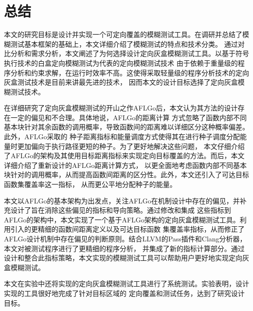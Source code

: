 \documentclass[bachelor]{njupthesis}
\begin{document}
\section{总结}
本文的研究目标是设计并实现一个可定向覆盖的模糊测试工具。在调研并总结了模糊测试基本框架的基础上，本文详细介绍了模糊测试的特点和技术分类。
通过对比分析和需求分析，本文阐述了为何选择设计定向灰盒模糊测试工具。以基于符号执行技术的白盒定向模糊测试为代表的定向模糊测试技术
由于依赖于重量级的程序分析和约束求解，在运行时效率不高。这使得采取轻量级的程序分析技术的定向灰盒测试技术是目前来讲最先进的技术，
因而本文的设计目标选择了定向灰盒模糊测试技术。

在详细研究了定向灰盒模糊测试的开山之作AFLGo后，本文认为其方法的设计存在一定的偏见和不合理。具体地说，AFLGo的距离计算
方式忽略了函数内部不同基本块针对其余函数的调用概率，导致函数间的距离难以详细区分这种概率偏差。此外，AFLGo采取的
种子距离指标和能量调度方式使得其在进行种子调度分配能量时更加偏向于执行路径更短的种子。为了更好地解决这些问题，
本文仔细介绍了AFLGo的架构及其使用目标距离指标来实现定向目标覆盖的方法。而后，本文详细介绍了重新设计的AFLGo距离计算方式，
以更全面地考虑函数内部不同基本块针对的调用概率，从而提高函数间距离的区分性。此外，本文还引入了可达目标函数集覆盖率这一指标，
从而更公平地分配种子的能量。

本文以AFLGo的基本架构为出发点，关注AFLGo在机制设计中存在的偏见，并补充设计了旨在消除这些偏见的指标和导向策略。通过修改和集成
这些指标到AFLGo的架构中，本文实现了一个基于AFLGo架构的定向灰盒模糊测试工具。利用引入的更精细的函数间距离定义以及可达目标函数
集覆盖率指标，从而修正了AFLGo设计机制中存在偏见的判断原则。结合LLVM的Pass插件和Clang分析器，本文对被测试程序进行了更精细的程序分析，
并集成了新的指标计算部分。通过设计和整合此指标策略，本文实现的模糊测试工具可以帮助用户更好地实现定向灰盒模糊测试。

本文在实验中还将实现的定向灰盒模糊测试工具进行了系统测试。实验表明，设计实现的工具很好地完成了针对目标区域的
定向覆盖和测试任务，达到了研究设计目标。
\end{document}

